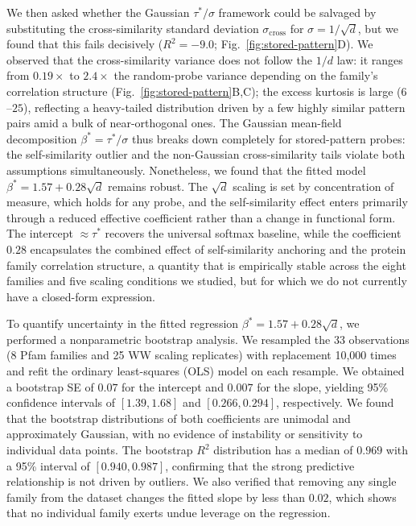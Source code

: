\label{app:stored-probes}
We then asked whether the Gaussian $\tau^*/\sigma$ framework could be salvaged by substituting the cross-similarity standard deviation $\sigma_{\mathrm{cross}}$ for $\sigma = 1/\sqrt{d}$, but we found that this fails decisively ($R^2 = -9.0$; Fig.~\ref{fig:stored-pattern}D). We observed that the cross-similarity variance does not follow the $1/d$ law: it ranges from $0.19\times$ to $2.4\times$ the random-probe variance depending on the family's correlation structure (Fig.~\ref{fig:stored-pattern}B,C); the excess kurtosis is large ($6$--$25$), reflecting a heavy-tailed distribution driven by a few highly similar pattern pairs amid a bulk of near-orthogonal ones. The Gaussian mean-field decomposition $\beta^* = \tau^*/\sigma$ thus breaks down completely for stored-pattern probes: the self-similarity outlier and the non-Gaussian cross-similarity tails violate both assumptions simultaneously. Nonetheless, we found that the fitted model $\beta^* = 1.57 + 0.28\sqrt{d}$ remains robust. The $\sqrt{d}$ scaling is set by concentration of measure, which holds for any probe, and the self-similarity effect enters primarily through a reduced effective coefficient rather than a change in functional form. The intercept $\approx \tau^*$ recovers the universal softmax baseline, while the coefficient $0.28$ encapsulates the combined effect of self-similarity anchoring and the protein family correlation structure, a quantity that is empirically stable across the eight families and five scaling conditions we studied, but for which we do not currently have a closed-form expression.

To quantify uncertainty in the fitted regression $\beta^* = 1.57 + 0.28\sqrt{d}$, we performed a nonparametric bootstrap analysis. We resampled the 33 observations (8 Pfam families and 25 WW scaling replicates) with replacement 10{,}000 times and refit the ordinary least-squares (OLS) model on each resample. We obtained a bootstrap SE of $0.07$ for the intercept and $0.007$ for the slope, yielding 95\% confidence intervals of $[1.39, 1.68]$ and $[0.266, 0.294]$, respectively. We found that the bootstrap distributions of both coefficients are unimodal and approximately Gaussian, with no evidence of instability or sensitivity to individual data points. The bootstrap $R^2$ distribution has a median of $0.969$ with a 95\% interval of $[0.940, 0.987]$, confirming that the strong predictive relationship is not driven by outliers. We also verified that removing any single family from the dataset changes the fitted slope by less than $0.02$, which shows that no individual family exerts undue leverage on the regression.

